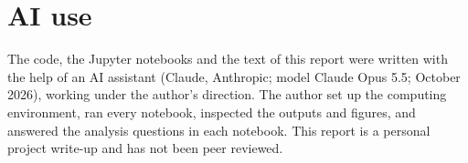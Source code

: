 \documentclass[11pt]{article}
\begin{document}
\section*{AI use}
The code, the Jupyter notebooks and the text of this report were written with the help of an AI assistant (Claude, Anthropic; model Claude Opus 5.5; October 2026), working under the author's direction. The author set up the computing environment, ran every notebook, inspected the outputs and figures, and answered the analysis questions in each notebook. This report is a personal project write-up and has not been peer reviewed.



\end{document}
